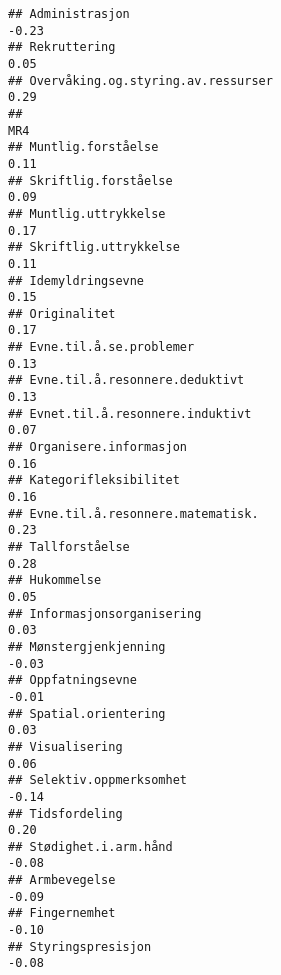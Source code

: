 \documentclass[
]{article}
\begin{document}
\begin{verbatim}
## Administrasjon                                                                   -0.23
## Rekruttering                                                                      0.05
## Overvåking.og.styring.av.ressurser                                                0.29
##                                                                                    MR4
## Muntlig.forståelse                                                                0.11
## Skriftlig.forståelse                                                              0.09
## Muntlig.uttrykkelse                                                               0.17
## Skriftlig.uttrykkelse                                                             0.11
## Idemyldringsevne                                                                  0.15
## Originalitet                                                                      0.17
## Evne.til.å.se.problemer                                                           0.13
## Evne.til.å.resonnere.deduktivt                                                    0.13
## Evnet.til.å.resonnere.induktivt                                                   0.07
## Organisere.informasjon                                                            0.16
## Kategorifleksibilitet                                                             0.16
## Evne.til.å.resonnere.matematisk.                                                  0.23
## Tallforståelse                                                                    0.28
## Hukommelse                                                                        0.05
## Informasjonsorganisering                                                          0.03
## Mønstergjenkjenning                                                              -0.03
## Oppfatningsevne                                                                  -0.01
## Spatial.orientering                                                               0.03
## Visualisering                                                                     0.06
## Selektiv.oppmerksomhet                                                           -0.14
## Tidsfordeling                                                                     0.20
## Stødighet.i.arm.hånd                                                             -0.08
## Armbevegelse                                                                     -0.09
## Fingernemhet                                                                     -0.10
## Styringspresisjon                                                                -0.08

\end{verbatim}
\end{document}

